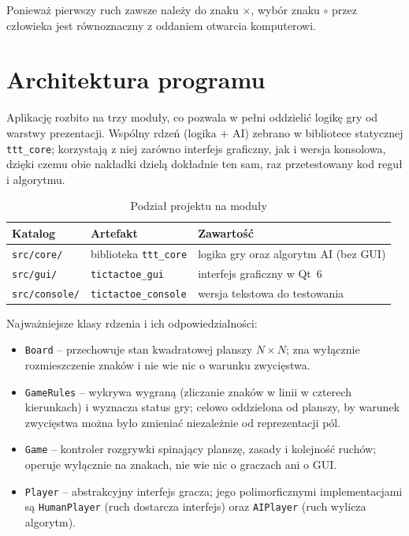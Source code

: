 Ponieważ pierwszy ruch zawsze należy do znaku $\times$, wybór znaku $\circ$ przez człowieka jest
równoznaczny z oddaniem otwarcia komputerowi.


\section{Architektura programu}

Aplikację rozbito na trzy moduły, co pozwala w pełni oddzielić logikę gry od warstwy prezentacji.
Wspólny rdzeń (logika + AI) zebrano w bibliotece statycznej \texttt{ttt\_core}; korzystają z niej
zarówno interfejs graficzny, jak i wersja konsolowa, dzięki czemu obie nakładki dzielą dokładnie
ten sam, raz przetestowany kod reguł i algorytmu.

\begin{table}[H]
\centering
\caption{Podział projektu na moduły}
\begin{tabular}{@{}lll@{}}
\toprule
\textbf{Katalog} & \textbf{Artefakt} & \textbf{Zawartość}\\
\midrule
\texttt{src/core/}    & biblioteka \texttt{ttt\_core} & logika gry oraz algorytm AI (bez GUI)\\
\texttt{src/gui/}     & \texttt{tictactoe\_gui}       & interfejs graficzny w Qt~6\\
\texttt{src/console/} & \texttt{tictactoe\_console}   & wersja tekstowa do testowania\\
\bottomrule
\end{tabular}
\end{table}

Najważniejsze klasy rdzenia i ich odpowiedzialności:
\begin{itemize}
    \item \texttt{Board} -- przechowuje stan kwadratowej planszy $N\times N$; zna wyłącznie
          rozmieszczenie znaków i nie wie nic o warunku zwycięstwa.
    \item \texttt{GameRules} -- wykrywa wygraną (zliczanie znaków w linii w czterech kierunkach)
          i wyznacza status gry; celowo oddzielona od planszy, by warunek zwycięstwa można było
          zmieniać niezależnie od reprezentacji pól.
    \item \texttt{Game} -- kontroler rozgrywki spinający planszę, zasady i kolejność ruchów;
          operuje wyłącznie na znakach, nie wie nic o graczach ani o GUI.
    \item \texttt{Player} -- abstrakcyjny interfejs gracza; jego polimorficznymi implementacjami
          są \texttt{HumanPlayer} (ruch dostarcza interfejs) oraz \texttt{AIPlayer}
          (ruch wylicza algorytm).
\end{itemize}

